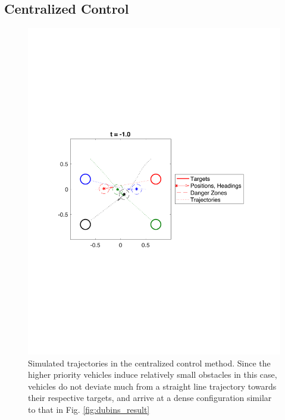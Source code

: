 \subsection{Centralized Control}
\begin{figure}
  \centering
  \includegraphics[width=\columnwidth]{"fig/cc_traj"}
  \caption{Simulated trajectories in the centralized control method. Since the higher priority vehicles induce relatively small obstacles in this case, vehicles do not deviate much from a straight line trajectory towards their respective targets, and arrive at a dense configuration similar to that in Fig. \ref{fig:dubins_result}}
  \label{fig:cc_traj}
\end{figure}

